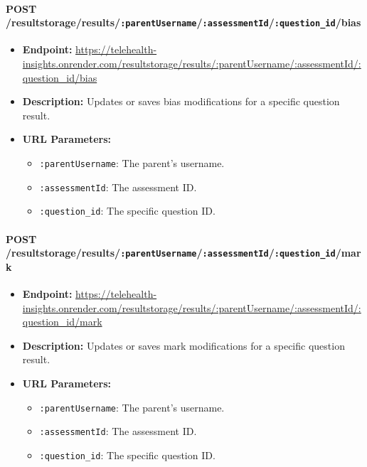 \documentclass{article}
\begin{document}
  \paragraph{POST /resultstorage/results/\texttt{:parentUsername}/\texttt{:assessmentId}/\texttt{:question\_id}/bias}
  \begin{itemize}
      \item \textbf{Endpoint:} 
          \url{https://telehealth-insights.onrender.com/resultstorage/results/:parentUsername/:assessmentId/:question_id/bias}
      \item \textbf{Description:} Updates or saves bias modifications for a specific 
            question result.
      \item \textbf{URL Parameters:}
      \begin{itemize}
          \item \texttt{:parentUsername}: The parent’s username.
          \item \texttt{:assessmentId}: The assessment ID.
          \item \texttt{:question\_id}: The specific question ID.
      \end{itemize}
  \end{itemize}
  
  \paragraph{POST /resultstorage/results/\texttt{:parentUsername}/\texttt{:assessmentId}/\texttt{:question\_id}/mark}
  \begin{itemize}
      \item \textbf{Endpoint:} 
          \url{https://telehealth-insights.onrender.com/resultstorage/results/:parentUsername/:assessmentId/:question_id/mark}
      \item \textbf{Description:} Updates or saves mark modifications for a specific 
            question result.
      \item \textbf{URL Parameters:}
      \begin{itemize}
          \item \texttt{:parentUsername}: The parent’s username.
          \item \texttt{:assessmentId}: The assessment ID.
          \item \texttt{:question\_id}: The specific question ID.
      \end{itemize}
  \end{itemize}
  
\end{document}
